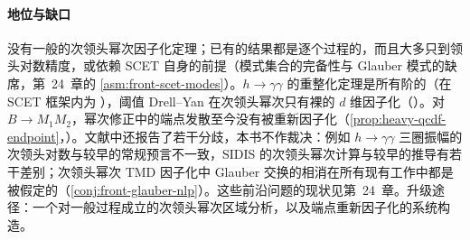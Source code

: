 \paragraph{地位与缺口}
没有一般的次领头幂次因子化定理；已有的结果都是逐个过程的，而且大多只到领头对数精度，或依赖 SCET 自身的前提（模式集合的完备性与 Glauber 模式的缺席，第~24~章的 \cref{asm:front-scet-modes}）。$h\to\gamma\gamma$ 的重整化定理是所有阶的（在 SCET 框架内为 \tagA），阈值 Drell--Yan 在次领头幂次只有裸的 $d$ 维因子化\cite{Beneke:2019oqx}（\tagP）。对 $B\to M_1M_2$，幂次修正中的端点发散至今没有被重新因子化（\cref{prop:heavy-qcdf-endpoint}，\tagV）。文献中还报告了若干分歧，本书不作裁决：例如 $h\to\gamma\gamma$ 三圈振幅的次领头对数与较早的常规预言不一致\cite{Liu:2020wbn,Akhoury:2001mz}，SIDIS 的次领头幂次计算与较早的推导有若干差别\cite{Rodini:2023plb}；次领头幂次 TMD 因子化中 Glauber 交换的相消在所有现有工作中都是被假定的（\cref{conj:front-glauber-nlp}）。这些前沿问题的现状见第~24~章。升级途径：一个对一般过程成立的次领头幂次区域分析，以及端点重新因子化的系统构造。
